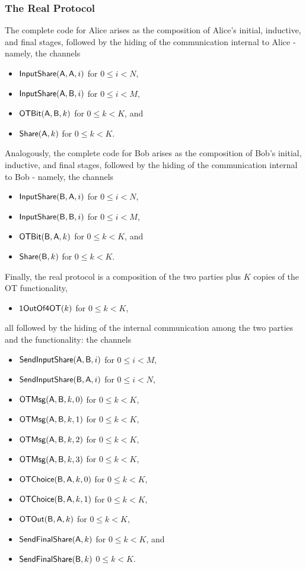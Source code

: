 \subsubsection{The Real Protocol}
The complete code for Alice arises as the composition of Alice's initial, inductive, and final stages, followed by the hiding of the communication internal to Alice - namely, the channels\smallskip
\begin{itemize}
\item $\mathsf{InputShare}(\mathsf{A},\mathsf{A},i)$ for $0 \leq i < N$,
\item $\mathsf{InputShare}(\mathsf{A},\mathsf{B},i)$ for $0 \leq i < M$,
\item $\mathsf{OTBit}(\mathsf{A},\mathsf{B},k)$ for $0 \leq k < K$, and
\item $\mathsf{Share}(\mathsf{A},k)$ for $0 \leq k < K$.
\end{itemize}\smallskip
Analogously, the complete code for Bob arises as the composition of Bob's initial, inductive, and final stages, followed by the hiding of the communication internal to Bob - namely, the channels\smallskip
\begin{itemize}
\item $\mathsf{InputShare}(\mathsf{B},\mathsf{A},i)$ for $0 \leq i < N$,
\item $\mathsf{InputShare}(\mathsf{B},\mathsf{B},i)$ for $0 \leq i < M$,
\item $\mathsf{OTBit}(\mathsf{B},\mathsf{A},k)$ for $0 \leq k < K$, and
\item $\mathsf{Share}(\mathsf{B},k)$ for $0 \leq k < K$.
\end{itemize}\smallskip
Finally, the real protocol is a composition of the two parties plus $K$ copies of the OT functionality,
\begin{itemize}
\item $\mathsf{1OutOf4OT}(k)$ for $0 \leq k < K$,
\end{itemize}
all followed by the hiding of the internal communication among the two parties and the functionality: the channels\smallskip
\begin{itemize}
\item $\mathsf{SendInputShare}(\mathsf{A},\mathsf{B},i)$ for $0 \leq i < M$,
\item $\mathsf{SendInputShare}(\mathsf{B},\mathsf{A},i)$ for $0 \leq i < N$,
\item $\mathsf{OTMsg}(\mathsf{A},\mathsf{B},k,0)$ for $0 \leq k < K$,
\item $\mathsf{OTMsg}(\mathsf{A},\mathsf{B},k,1)$ for $0 \leq k < K$,
\item $\mathsf{OTMsg}(\mathsf{A},\mathsf{B},k,2)$ for $0 \leq k < K$,
\item $\mathsf{OTMsg}(\mathsf{A},\mathsf{B},k,3)$ for $0 \leq k < K$,
\item $\mathsf{OTChoice}(\mathsf{B},\mathsf{A},k,0)$ for $0 \leq k < K$,
\item $\mathsf{OTChoice}(\mathsf{B},\mathsf{A},k,1)$ for $0 \leq k < K$,
\item $\mathsf{OTOut}(\mathsf{B},\mathsf{A},k)$ for $0 \leq k < K$,
\item $\mathsf{SendFinalShare}(\mathsf{A},k)$ for $0 \leq k < K$, and
\item $\mathsf{SendFinalShare}(\mathsf{B},k)$ $0 \leq k < K$.
\end{itemize}

